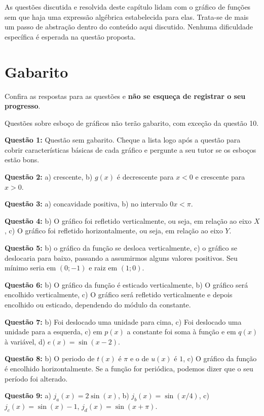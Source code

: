 \documentclass[main_estudante.tex]{subfiles}
\begin{document}
As questões discutida e resolvida deste capítulo lidam com o gráfico de funções sem que haja uma expressão algébrica estabelecida para elas. Trata-se de mais um passo de abstração dentro do conteúdo aqui discutido. Nenhuma dificuldade específica é esperada na questão proposta.

\section{Gabarito}

Confira as respostas para as questões e \textbf{não se esqueça de registrar o seu progresso}.

Questões sobre esboço de gráficos não terão gabarito, com exceção da questão 10.

\noindent\textbf{Questão 1:} Questão sem gabarito. Cheque a lista logo após a questão para cobrir características básicas de cada gráfico e pergunte a seu tutor se os esboços estão bons.

\noindent\textbf{Questão 2:} a) crescente, b) $g(x)$ é decrescente para $x<0$ e crescente para $x>0$.

\noindent\textbf{Questão 3:} a) concavidade positiva, b) no intervalo $0x<\pi$.

\noindent\textbf{Questão 4:} b) O gráfico foi refletido verticalmente, ou seja, em relação ao eixo $X$, c) O gráfico foi refletido horizontalmente, ou seja, em relação ao eixo $Y$.

\noindent\textbf{Questão 5:} b) o gráfico da função se desloca verticalmente, c) o gráfico se deslocaria para baixo, passando a assumirmos alguns valores positivos. Seu mínimo seria em $(0;-1)$ e raiz em $(1;0)$.

\noindent\textbf{Questão 6:} b) O gráfico da função é esticado verticalmente, b) O gráfico será encolhido verticalmente, c) O gráfico será refletido verticalmente e depois encolhido ou esticado, dependendo do módulo da constante.

\noindent\textbf{Questão 7:} b) Foi deslocado uma unidade para cima, c) Foi deslocado uma unidade para a esquerda, c) em $p(x)$ a constante foi soma à função e em $q(x)$ à variável, d) $e(x)=\sin(x-2)$.

\noindent\textbf{Questão 8:} b) O periodo de $t(x)$ é $\pi$ e o de $u(x)$ é $1$, c) O gráfico da função é encolhido horizontalmente. Se a função for periódica, podemos dizer que o seu período foi alterado.

\noindent\textbf{Questão 9:} a) $j_a(x)=2\sin(x)$, b) $j_b(x)=\sin(x/4)$, c)$j_c(x)=\sin(x)-1$, $j_d(x)=\sin(x+\pi)$.
\end{document}
